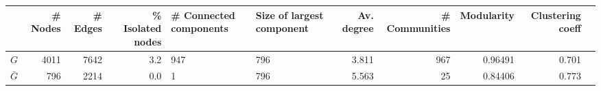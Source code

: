 \begin{tabular}{lrrrP{0.2\textwidth}P{0.2\textwidth}rrrrr}
\toprule
{} &  \# Nodes &  \# Edges  &  \% Isolated nodes &  \# Connected components &  Size of largest component &  Av. degree &  \# Communities &  Modularity &  Clustering coeff \\
\midrule
$G$       &     4011 &     7642 &               3.2 &                     947 &                        796 &       3.811 &            967 &     0.96491 &             0.701 \\
$\bar{G}$ &      796 &     2214 &               0.0 &                       1 &                        796 &       5.563 &             25 &     0.84406 &             0.773 \\
\bottomrule
\end{tabular}
